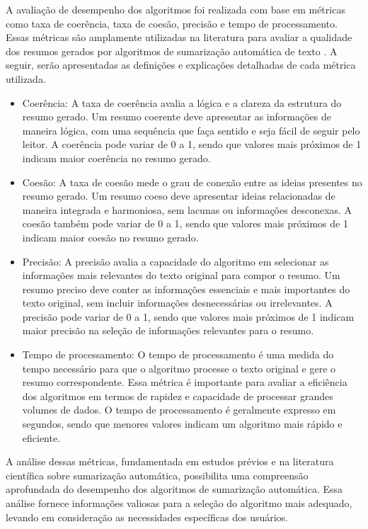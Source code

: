 A avaliação de desempenho dos algoritmos foi realizada com base em métricas como taxa de coerência, taxa de coesão, precisão e tempo de processamento. Essas métricas são amplamente utilizadas na literatura para avaliar a qualidade dos resumos gerados por algoritmos de sumarização automática de texto \cite{pandian2021performance}. A seguir, serão apresentadas as definições e explicações detalhadas de cada métrica utilizada.
\begin{itemize}
    \item Coerência: A taxa de coerência avalia a lógica e a clareza da     estrutura do resumo gerado. Um resumo coerente deve apresentar as informações de maneira lógica, com uma sequência que faça sentido e     seja fácil de seguir pelo leitor. A coerência pode variar de 0 a 1, sendo que valores mais próximos de 1 indicam maior coerência no resumo gerado.

    \item Coesão: A taxa de coesão mede o grau de conexão entre as ideias presentes no resumo gerado. Um resumo coeso deve apresentar ideias relacionadas de maneira integrada e harmoniosa, sem lacunas ou informações desconexas. A coesão também pode variar de 0 a 1, sendo que valores mais próximos de 1 indicam maior coesão no resumo gerado.

    \item Precisão: A precisão avalia a capacidade do algoritmo em selecionar as informações mais relevantes do texto original para 
    compor o resumo. Um resumo preciso deve conter as informações 
    essenciais e mais importantes do texto original, sem incluir 
    informações desnecessárias ou irrelevantes. A precisão pode variar 
    de 0 a 1, sendo que valores mais próximos de 1 indicam maior 
    precisão na seleção de informações relevantes para o resumo.

    \item Tempo de processamento: O tempo de processamento é uma medida 
    do tempo necessário para que o algoritmo processe o texto original e gere o resumo correspondente. Essa métrica é importante para avaliar a eficiência dos algoritmos em termos de rapidez e capacidade de processar grandes volumes de dados. O tempo de processamento é geralmente expresso em segundos, sendo que menores valores indicam um algoritmo mais rápido e eficiente.
\end{itemize}

A análise dessas métricas, fundamentada em estudos prévios e na literatura científica sobre sumarização automática, possibilita uma compreensão aprofundada do desempenho dos algoritmos de sumarização automática. Essa análise fornece informações valiosas para a seleção do algoritmo mais adequado, levando em consideração as necessidades específicas dos usuários.

